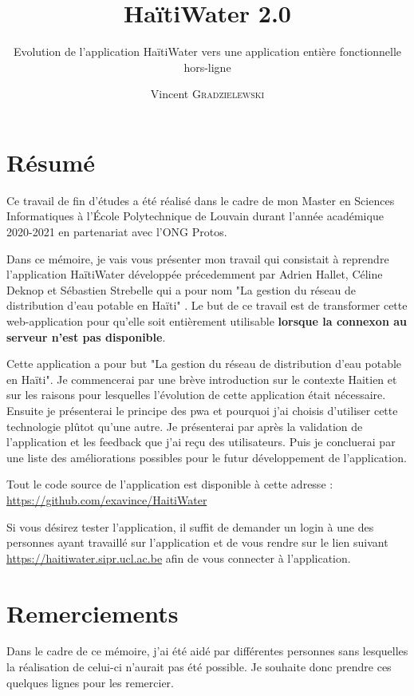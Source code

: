 \documentclass{EPL-master-thesis-covers-FR}
\title{HaïtiWater 2.0}
\subtitle{Evolution de l'application HaïtiWater vers une application entière  fonctionnelle hors-ligne}
\author{Vincent \textsc{Gradzielewski}}%
\begin{document}
	\maketitle
	\tableofcontents

	\setlength{\parskip}{1.5em plus1em minus1em}


	\chapter*{Résumé}
	
	
		Ce travail de fin d'études a été réalisé dans le cadre de mon Master en Sciences Informatiques à l'École Polytechnique de Louvain durant l'année académique 2020-2021 en partenariat avec l'ONG Protos.
		
		Dans ce mémoire, je vais vous présenter mon travail qui consistait à reprendre l'application HaïtiWater développée précedemment par Adrien Hallet, Céline Deknop et Sébastien Strebelle qui a pour nom "La gestion du réseau de distribution d'eau potable en Haïti" \cite{ref:haitiwater}. Le but de ce travail est de transformer cette web-application pour qu'elle soit entièrement utilisable \textbf{lorsque la connexon au serveur n'est pas disponible}.
	
		Cette application a pour but "La gestion du réseau de distribution d'eau potable en Haïti". Je commencerai par une brève introduction sur le contexte Haitien et sur les raisons pour lesquelles l'évolution de cette application était nécessaire. Ensuite je présenterai le principe des \gls{pwa} et pourquoi j'ai choisis d'utiliser cette technologie plûtot qu'une autre. Je présenterai par après la validation de l'application et les feedback que j'ai reçu des utilisateurs. Puis je concluerai par une liste des améliorations possibles pour le futur développement de l'application.

		Tout le code source de l'application est disponible à cette adresse : \url{https://github.com/exavince/HaitiWater}

		Si vous désirez tester l'application, il suffit de demander un login à une des personnes ayant travaillé sur l'application et de vous rendre sur le lien suivant \url{https://haitiwater.sipr.ucl.ac.be} afin de vous connecter à l'application.
		

	\chapter*{Remerciements}
		Dans le cadre de ce mémoire, j'ai été aidé par différentes personnes sans lesquelles la réalisation de celui-ci n'aurait pas été possible. Je souhaite donc prendre ces quelques lignes pour les remercier.
		
\end{document}
